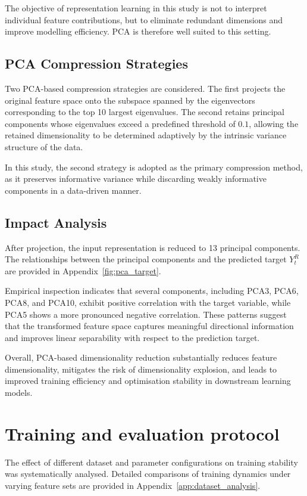 \documentclass[10pt]{article} %
\begin{document}
The objective of representation learning in this study is not to interpret individual feature contributions, but to eliminate redundant dimensions and improve modelling efficiency. PCA is therefore well suited to this setting.

\subsection{PCA Compression Strategies}

Two PCA-based compression strategies are considered. The first projects the original feature space onto the subspace spanned by the eigenvectors corresponding to the top 10 largest eigenvalues. The second retains principal components whose eigenvalues exceed a predefined threshold of $0.1$, allowing the retained dimensionality to be determined adaptively by the intrinsic variance structure of the data.

In this study, the second strategy is adopted as the primary compression method, as it preserves informative variance while discarding weakly informative components in a data-driven manner.

\subsection{Impact Analysis}

After projection, the input representation is reduced to 13 principal components. The relationships between the principal components and the predicted target $Y_t^{R}$ are provided in Appendix~\ref{fig:pca_target}.


Empirical inspection indicates that several components, including PCA3, PCA6, PCA8, and PCA10, exhibit positive correlation with the target variable, while PCA5 shows a more pronounced negative correlation. These patterns suggest that the transformed feature space captures meaningful directional information and improves linear separability with respect to the prediction target.

Overall, PCA-based dimensionality reduction substantially reduces feature dimensionality, mitigates the risk of dimensionality explosion, and leads to improved training efficiency and optimisation stability in downstream learning models.



\section{Training and evaluation protocol}
The effect of different dataset and parameter configurations on training stability was systematically analysed. 
Detailed comparisons of training dynamics under varying feature sets are provided in Appendix~\ref{app:dataset_analysis}.
\end{document}
